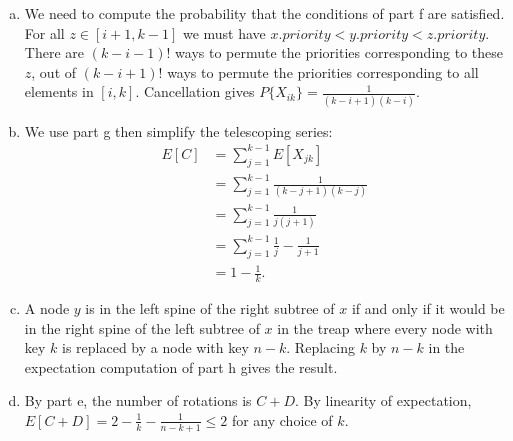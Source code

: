 \documentclass{article}
\begin{document}
\begin{enumerate}[a.]
\item We need to compute the probability that the conditions of part f are satisfied. For all $z \in [i+1, k-1]$ we must have $x.priority < y.priority < z.priority$.  There are $(k-i-1)!$ ways to permute the priorities corresponding to these $z$, out of $(k-i+1)!$ ways to permute the priorities corresponding to all elements in $[i,k]$.  Cancellation gives $P\{X_{ik}\} = \frac{1}{(k-i+1)(k-i)}$. \\

\item We use part g then simplify the telescoping series:
\begin{align*}
E[C] &= \sum_{j=1}^{k-1} E[X_{jk}] \\
&= \sum_{j=1}^{k-1} \frac{1}{(k-j+1)(k-j)}\\
&= \sum_{j=1}^{k-1}\frac{1}{j(j+1)} \\
&= \sum_{j=1}^{k-1}\frac{1}{j} - \frac{1}{j+1} \\
&= 1 - \frac{1}{k}.
\end{align*}

\item A node $y$ is in the left spine of the right subtree of $x$ if and only if it would be in the right spine of the left subtree of $x$ in the treap where every node with key $k$ is replaced by a node with key $n-k$.  Replacing $k$ by $n-k$ in the expectation computation of part h gives the result. \\

\item  By part e, the number of rotations is $C + D$.  By linearity of expectation, $E[C+D] = 2 - \frac{1}{k} - \frac{1}{n-k+1} \leq 2$ for any choice of $k$.

\end{enumerate}
\end{document}
